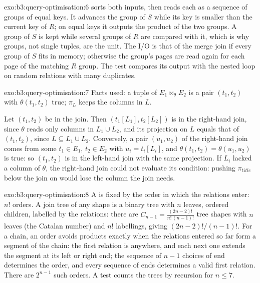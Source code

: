 \begin{solution}{exo:b3:query-optimisation:6}
 sorts both inputs, then reads each as a sequence of groups of equal keys. It advances the group of $S$ while its key is smaller than the current key of $R$; on equal keys it outputs the product of the two groups. A group of $S$ is kept while several groups of $R$ are compared with it, which is why groups, not single tuples, are the unit. The I/O is that of the merge join if every group of $S$ fits in memory; otherwise the group's pages are read again for each page of the matching $R$ group. The test compares its output with the nested loop on random relations with many duplicates.
\end{solution}

\begin{solution}{exo:b3:query-optimisation:7}
Facts used: a tuple of $E_1 \bowtie_\theta E_2$ is a pair $(t_1, t_2)$ with $\theta(t_1, t_2)$ true; $\pi_L$ keeps the columns in $L$.

Let $(t_1, t_2)$ be in the join. Then $(t_1[L_1], t_2[L_2])$ is in the right-hand join, since $\theta$ reads only columns in $L_1 \cup L_2$, and its projection on $L$ equals that of $(t_1, t_2)$, since $L \subseteq L_1 \cup L_2$. Conversely, a pair $(u_1, u_2)$ of the right-hand join comes from some $t_1 \in E_1$, $t_2 \in E_2$ with $u_i = t_i[L_i]$, and $\theta(t_1, t_2) = \theta(u_1, u_2)$ is true: so $(t_1, t_2)$ is in the left-hand join with the same projection. If $L_i$ lacked a column of $\theta$, the right-hand join could not evaluate its condition: pushing $\pi_{\mathit{title}}$ below the join on  would lose the column the join needs.
\end{solution}

\begin{solution}{exo:b3:query-optimisation:8}
A  is fixed by the order in which the relations enter: $n!$ orders. A join tree of any shape is a binary tree with $n$ leaves, ordered children, labelled by the relations: there are $C_{n-1} = \frac{(2n-2)!}{n!\,(n-1)!}$ tree shapes with $n$ leaves (the Catalan number) and $n!$ labellings, giving $(2n-2)!/(n-1)!$. For a chain, an order avoids products exactly when the relations entered so far form a segment of the chain: the first relation is anywhere, and each next one extends the segment at its left or right end; the sequence of $n - 1$ choices of end determines the order, and every sequence of ends determines a valid first relation. There are $2^{n-1}$ such orders. A test counts the trees by recursion for $n \le 7$.
\end{solution}

